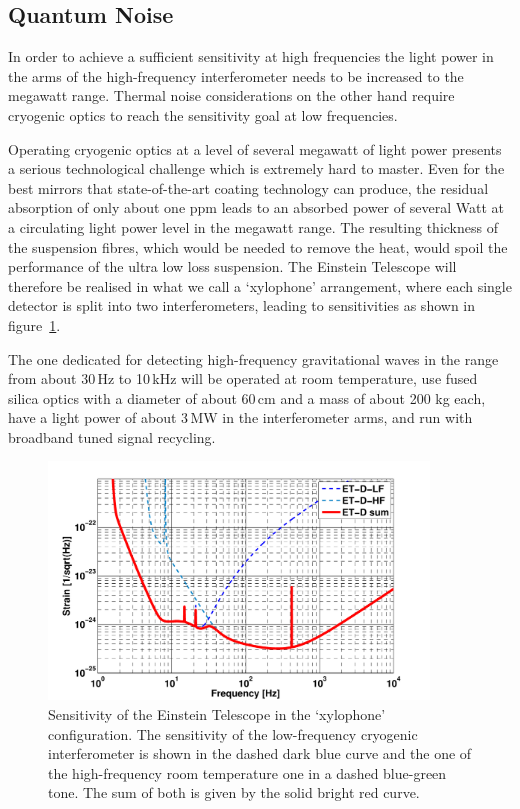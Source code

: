 \subsection{Quantum Noise} 

In order to achieve a sufficient sensitivity at high frequencies the light power in 
the arms of the high-frequency interferometer needs to be increased to the 
megawatt range. Thermal noise considerations on the other hand require cryogenic 
optics to reach the sensitivity goal at low frequencies. 

Operating cryogenic optics at a level of several megawatt of light power presents 
a serious technological challenge which is extremely hard to master. Even for 
the best mirrors that state-of-the-art coating technology can produce, the 
residual absorption of only about one ppm leads to an absorbed power of 
several Watt at a circulating light power level in the megawatt range. The resulting 
thickness of the suspension fibres, which would be needed to remove the heat, 
would spoil the performance of the ultra low loss suspension. The Einstein 
Telescope will therefore be realised in what we call a `xylophone' arrangement, 
where each single detector is split into two interferometers, leading to sensitivities 
as shown in figure~\ref{fig:ET_sensitivity}. 

The one dedicated for detecting 
high-frequency gravitational waves in the range from about 30\,Hz to 10\,kHz 
will be operated at room temperature, use fused silica optics with a diameter of 
about 60\,cm and a mass of about 200 kg each, have a light power of about 3\,MW 
in the interferometer arms, and run with broadband tuned signal recycling. 

\begin{figure}[h]
	\centering
		\includegraphics[width=0.9\textwidth]{Intro/Intro_Figures/ET_D_spectrum.pdf}
	\caption{Sensitivity of the Einstein Telescope in the `xylophone' configuration. 
	The sensitivity of the low-frequency cryogenic interferometer is shown in the 
	dashed dark blue curve and the one of the high-frequency room temperature 
	one in a dashed blue-green tone. The sum of both is given by the solid bright red curve.}
	\label{fig:ET_sensitivity}
\end{figure}

